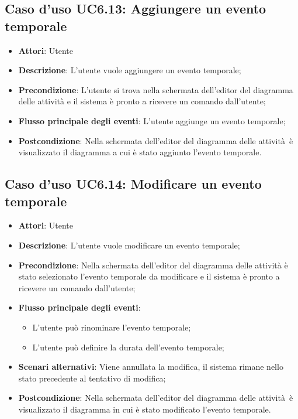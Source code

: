 \documentclass[../AnalisiDeiRequisiti.tex]{subfiles}
\begin{document}
				\subsection{Caso d'uso UC6.13: Aggiungere un evento temporale}
				\begin{itemize}
					\item \textbf{Attori}: Utente
					\item \textbf{Descrizione}: L'utente vuole aggiungere un evento temporale;
					\item \textbf{Precondizione}: L'utente si trova nella schermata dell'editor del diagramma delle attività e il sistema è pronto a ricevere un comando dall'utente;
					\item \textbf{Flusso principale degli eventi}: L'utente aggiunge un evento temporale;
					\item \textbf{Postcondizione}: Nella schermata dell'editor del diagramma delle attività è visualizzato il diagramma a cui è stato aggiunto l'evento temporale.
				\end{itemize}
				\subsection{Caso d'uso UC6.14: Modificare un evento temporale}
				\begin{itemize}
					\item \textbf{Attori}: Utente
					\item \textbf{Descrizione}: L'utente vuole modificare un evento temporale;
					\item \textbf{Precondizione}: Nella schermata dell'editor del diagramma delle attività è stato selezionato l'evento temporale da modificare e il sistema è pronto a ricevere un comando dall'utente;
					\item \textbf{Flusso principale degli eventi}: \begin{itemize}
						\item L'utente può rinominare l'evento temporale;
						\item L'utente può definire la durata dell'evento temporale;
					\end{itemize}
					\item \textbf{Scenari alternativi}: Viene annullata la modifica, il sistema rimane nello stato precedente al tentativo di modifica;
					\item \textbf{Postcondizione}: Nella schermata dell'editor del diagramma delle attività è visualizzato il diagramma in cui è stato modificato l'evento temporale.
				\end{itemize}
\end{document}
